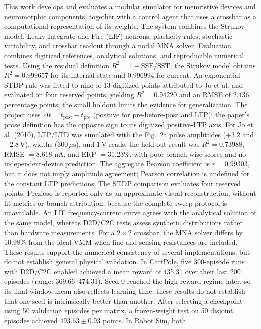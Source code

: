 This work develops and evaluates a modular simulator for memristive
devices and neuromorphic components, together with a control agent that
uses a crossbar as a computational representation of its weights. The
system combines the Strukov model, Leaky Integrate-and-Fire (LIF)
neurons, plasticity rules, stochastic variability, and crossbar
readout through a nodal MNA solver. Evaluation combines digitized
references, analytical solutions, and reproducible numerical tests.
Using the residual definition $R^2=1-\mathrm{SSE}/\mathrm{SST}$, the
Strukov model obtains $R^2=0.999657$ for its internal state and
$0.996994$ for current. An exponential STDP rule was fitted to nine of
13 digitized points attributed to Jo et al. and evaluated on four
reserved points, yielding $R^2=0.94220$ and an RMSE of $2.136$ percentage
points; the small holdout limits the evidence for generalization. The
project uses $\Delta t=t_{\mathrm{post}}-t_{\mathrm{pre}}$ (positive for
pre-before-post and LTP); the paper's prose definition has the opposite
sign to its digitized positive-LTP axis. For Jo et al. (2010), LTP/LTD
was simulated with
the Fig.~2a pulse amplitudes ($+3.2$ and $-2.8\,\mathrm{V}$), widths
($300\,\mu\mathrm{s}$), and $1\,\mathrm{V}$ reads; the held-out result
was $R^2=0.73988$, RMSE $=8.618$ nA, and ERP $=31.23\%$, with poor
branch-wise scores and no independent-device prediction. The aggregate
Pearson coefficient is $r=0.99303$, but it does not imply amplitude
agreement; Pearson correlation is undefined for the constant LTP
predictions. The STDP comparison evaluates four reserved points.
Prezioso is reported only as
an approximate visual reconstruction, without fit metrics or branch
attribution, because the complete sweep protocol is unavailable. An LIF
frequency-current curve agrees with the analytical solution of the same
model, whereas D2D/C2C tests assess synthetic distributions rather than
hardware measurements. For a $2\times2$ crossbar, the MNA solver differs
by 10.98\% from the ideal VMM when line and sensing resistances are
included. These results support the numerical consistency of several
implementations, but do not establish general physical validation. In
CartPole, five 300-episode runs with D2D/C2C enabled achieved a mean
reward of 435.31 over their last 200 episodes (range: 369.66--474.31).
Seed 0 reached the high-reward regime later, so its final-window mean
also reflects learning time; these results do not establish that one
seed is intrinsically better than another. After selecting a checkpoint
using 50 validation episodes per matrix, a frozen-weight test on 50 disjoint episodes achieved $493.63\pm0.93$ points. In Robot Sim, both
